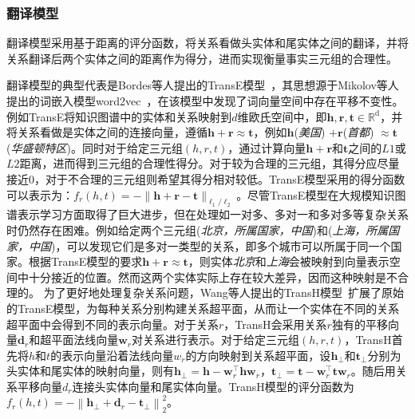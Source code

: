 \documentclass[algorithmlist, AutoFakeBold, AutoFakeSlant, figurelist, tablelist, nomlist, engineering, openany]{seuthesix} %
\begin{document}

\subsubsection{翻译模型}
翻译模型采用基于距离的评分函数，将关系看做头实体和尾实体之间的翻译，并将关系翻译后两个实体之间的距离作为得分，进而实现衡量事实三元组的合理性。

翻译模型的典型代表是Bordes等人提出的TransE模型~\cite{bordes2013translating}，其思想源于Mikolov等人提出的词嵌入模型word2vec~\cite{toms2013}，在该模型中发现了词向量空间中存在平移不变性。例如TransE将知识图谱中的实体和关系映射到$d$维欧氏空间中，即$\bm{h}, \bm{r}, \bm{t} \in \mathbb{R}^{\mathrm{d}}$，并将关系看做是实体之间的连接向量，遵循$\bm{h} + \bm{r} \approx \bm{t}$，例如$\bm{h}$(\textit{美国}) $+ \bm{r}$(\textit{首都}) $\approx \bm{t}$(\textit{华盛顿特区})。同时对于给定三元组$(h, r, t)$，通过计算向量$\bm{h} + \bm{r}$和$\bm{t}$之间的$L1$或$L2$距离，进而得到三元组的合理性得分。对于较为合理的三元组，其得分应尽量接近0，对于不合理的三元组则希望其得分相对较低。TransE模型采用的得分函数可以表示为：$f_r(h, t) = - \|\bm{h} + \bm{r} - \bm{t}\|_{\ell_1 / \ell_2}$。尽管TransE模型在大规模知识图谱表示学习方面取得了巨大进步，但在处理如一对多、多对一和多对多等复杂关系时仍然存在困难。例如给定两个三元组(\textit{北京，所属国家，中国})和(\textit{上海，所属国家，中国})，可以发现它们是多对一类型的关系，即多个城市可以所属于同一个国家。根据TransE模型的要求$\bm{h} + \bm{r} \approx \bm{t}$，则实体\textit{北京}和\textit{上海}会被映射到向量表示空间中十分接近的位置。然而这两个实体实际上存在较大差异，因而这种映射是不合理的。
为了更好地处理复杂关系问题，Wang等人提出的TransH模型~\cite{wang2014knowledge}扩展了原始的TransE模型，为每种关系分别构建关系超平面，从而让一个实体在不同的关系超平面中会得到不同的表示向量。对于关系$r$，TransH会采用关系$r$独有的平移向量$\bm{d}_r$和超平面法线向量$\bm{w}_r$对关系进行表示。对于给定三元组$(h, r, t)$，TransH首先将$h$和$t$的表示向量沿着法线向量$w_r$的方向映射到关系超平面，设$\bm{h}_\perp$和$\bm{t}_\perp$分别为头实体和尾实体的映射向量，则有$\bm{h}_{\perp} = \bm{h} - \bm{w}_r^{\top} \bm{h} \bm{w}_r$，$\bm{t}_{\perp} = \bm{t} - \bm{w}_r^{\top} \bm{t} \bm{w}_r$。随后用关系平移向量$d_r$连接头实体向量和尾实体向量。TransH模型的评分函数为$f_r(h, t) = -\left\|\bm{h}_{\perp} + \bm{d}_r - \bm{t}_{\perp}\right\|_2^2$。
\end{document}
